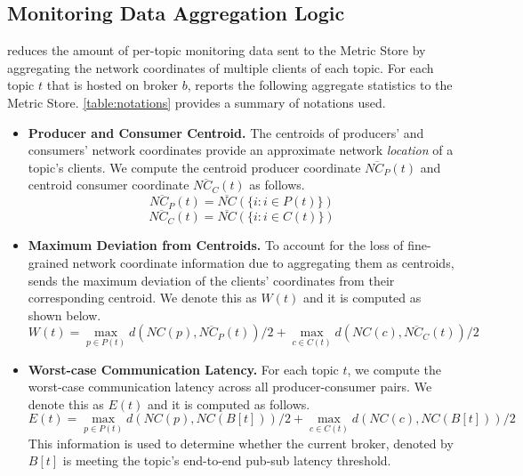 \subsection{Monitoring Data Aggregation Logic}
\label{sec:epulsar_mon_aggr}
\epulsar{} reduces the amount of per-topic monitoring data sent to the Metric Store by aggregating the network coordinates of multiple clients of each topic. For each topic $t$ that is hosted on broker $b$, \epulsar{} reports the following aggregate statistics to the Metric Store. \cref{table:notations} provides a summary of notations used.
\begin{itemize}
\item \textbf{Producer and Consumer Centroid.} The centroids of producers' and consumers' network coordinates provide an approximate network \textit{location} of a topic's clients. We compute the centroid producer coordinate $\overline{NC_P}\left( t \right)$ and centroid consumer coordinate $\overline{NC_C}\left( t \right)$ as follows.
\begin{equation*}
\overline{NC_P}\left( t \right) = \overline{NC} \left( \{ i : i \in P\left( t \right) \} \right)
\end{equation*}
\begin{equation*}
\overline{NC_C}\left( t \right) = \overline{NC} \left( \{ i : i \in C\left( t \right) \} \right)
\end{equation*}
\item \textbf{Maximum Deviation from Centroids.} To account for the loss of fine-grained network coordinate information due to aggregating them as centroids, \epulsar{} sends the maximum deviation of the clients' coordinates from their corresponding centroid. We denote this as $W \left( t \right)$ and it is computed as shown below.
\begin{equation*}
W \left( t \right) = \max\limits_{p \in P\left( t \right)} d \left( NC \left( p\right), \overline{NC_P}\left( t \right)\right)/2 + \max\limits_{c \in C\left( t \right)} d \left( NC \left( c\right), \overline{NC_C}\left( t \right)\right)/2
\end{equation*}
\item \textbf{Worst-case Communication Latency.} For each topic $t$, we compute the worst-case communication latency across all producer-consumer pairs. We denote this as $E \left( t \right)$ and it is computed as follows. 
\begin{equation*}
E \left( t \right) = \max\limits_{p \in P\left( t \right)} d \left( NC \left( p\right), NC\left( B\left[ t \right] \right) \right) / 2 + \max\limits_{c \in C\left( t \right)} d \left( NC \left( c\right), NC\left( B\left[ t \right] \right) \right) / 2
\end{equation*}
This information is used to determine whether the current broker, denoted by $B\left[ t \right]$ is meeting the topic's end-to-end pub-sub latency threshold.
\end{itemize}

